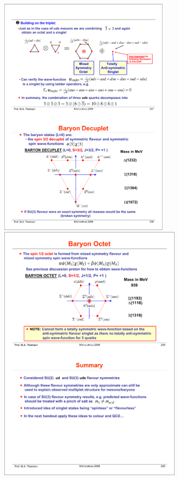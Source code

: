 \begin{center}
\includegraphics[width=0.65\textwidth]{fig/strongforce/baryon_decouplet.pdf}\\
\includegraphics[width=0.7\textwidth]{fig/strongforce/baryon_octet.pdf}\\

\end{center}

